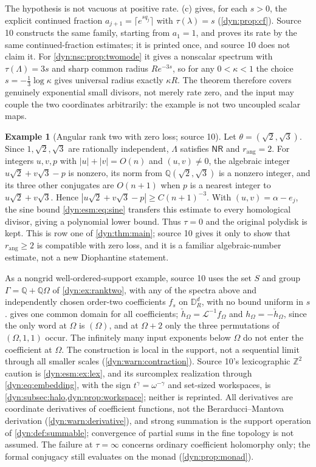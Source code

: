 \documentclass[11pt,letterpaper]{article}
\theoremstyle{definition}
\newtheorem{example}[example]{Example}
\theoremstyle{remark}
\newcommand{\Q}{\mathbb Q}
\newcommand{\Z}{\mathbb Z}
\newcommand{\Li}{\mathcal L}
\newcommand{\nres}{\mathsf{NR}}
\newcommand{\rang}{r_{\mathrm{ang}}}
\numberwithin{equation}{section}
\begin{document}
The hypothesis is not vacuous at positive rate. (c)
gives, for each $s>0$, the explicit continued fraction
$a_{j+1}=\lceil e^{sq_j}\rceil$ with $\tau(\lambda)=s$
(\cref{dyn:prop:cf}). Source 10 constructs the same family, starting from
$a_1=1$, and proves its rate by the same continued-fraction estimates; it
is printed once, and source 10 does not claim it. For
\cref{dyn:nsc:prop:twomode} it gives a nonscalar spectrum with
$\tau(\Lambda)=3s$ and sharp common radius $Re^{-3s}$, so for any
$0<\kappa<1$ the choice $s=-\tfrac13\log\kappa$ gives universal radius
exactly $\kappa R$. The theorem therefore covers genuinely exponential small
divisors, not merely rate zero, and the input may couple the two coordinates
arbitrarily: the example is not two uncoupled scalar maps.

\begin{example}[Angular rank two with zero loss; source 10]
\label{dyn:nsc:ex:ranktwo}
Let $\theta=(\sqrt2,\sqrt3)$. Since $1,\sqrt2,\sqrt3$ are rationally
independent, $\Lambda$ satisfies $\nres$ and $\rang=2$. For integers
$u,v,p$ with $|u|+|v|=O(n)$ and $(u,v)\ne0$, the algebraic integer
$u\sqrt2+v\sqrt3-p$ is nonzero, its norm from $\Q(\sqrt2,\sqrt3)$ is a nonzero
integer, and its three other conjugates are $O(n+1)$ when $p$ is a nearest
integer to $u\sqrt2+v\sqrt3$. Hence
$|u\sqrt2+v\sqrt3-p|\ge C(n+1)^{-3}$. With $(u,v)=\alpha-e_j$, the sine
bound \eqref{dyn:esm:eq:sine} transfers this estimate to every homological
divisor, giving a polynomial lower bound. Thus $\tau=0$ and the
original polydisk is kept. This is row one of \cref{dyn:thm:main}; source
10 gives it only to show that $\rang\ge2$ is compatible with zero loss, and
it is a familiar algebraic-number estimate, not a new Diophantine statement.
\end{example}

As a nongrid well-ordered-support example, source 10 uses the set $S$
and group $\Gamma=\Q+\Q\Omega$ of \cref{dyn:ex:ranktwo}, with any of the
spectra above and independently chosen order-two coefficients $f_s$ on
$\mathbb D_R^{d}$, with no bound uniform in $s$. 
gives one common domain for all coefficients; $\check h_\Omega=\Li^{-1}f_\Omega$
and $h_\Omega=-\check h_\Omega$, since the only word at $\Omega$ is $(\Omega)$,
and at $\Omega+2$ only the three permutations of $(\Omega,1,1)$ occur. The
infinitely many input exponents below $\Omega$ do not enter the coefficient
at $\Omega$. The construction is local in the support, not a sequential
limit through all smaller scales (\cref{dyn:warn:contraction}). Source 10's
lexicographic $\Z^{2}$ caution is \cref{dyn:esm:ex:lex}, and its
surcomplex realization through \eqref{dyn:eq:embedding}, with the sign
$t^{\gamma}=\omega^{-\gamma}$ and set-sized workspaces, is
\cref{dyn:subsec:halo,dyn:prop:workspace}; neither is reprinted. All
derivatives are coordinate derivatives of coefficient functions, not the
Berarducci--Mantova derivation (\cref{dyn:warn:derivative}), and strong
summation is the support operation of \cref{dyn:def:summable}; convergence
of partial sums in the fine topology is not assumed. The failure at
$\tau=\infty$ concerns ordinary
coefficient holomorphy only; the formal conjugacy still evaluates on the
monad (\cref{dyn:prop:monad}).
\end{document}
